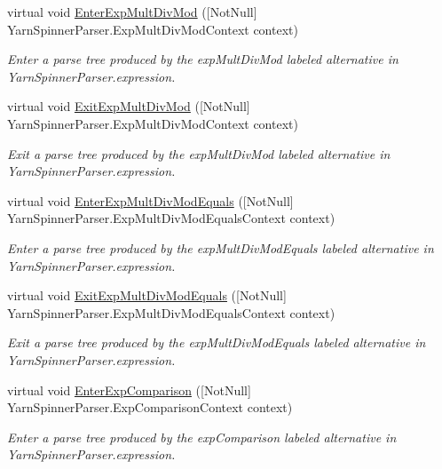 \begin{DoxyCompactItemize}
virtual void \hyperlink{a00196_a680b607d4481e92d0b601f2802d93584}{Enter\-Exp\-Mult\-Div\-Mod} (\mbox{[}Not\-Null\mbox{]} Yarn\-Spinner\-Parser.\-Exp\-Mult\-Div\-Mod\-Context context)
\begin{DoxyCompactList}\small\item\em Enter a parse tree produced by the {\ttfamily exp\-Mult\-Div\-Mod} labeled alternative in Yarn\-Spinner\-Parser.\-expression. \end{DoxyCompactList}\item 
virtual void \hyperlink{a00196_ac874c7fdb818e8f1d4a0ed8cb272804c}{Exit\-Exp\-Mult\-Div\-Mod} (\mbox{[}Not\-Null\mbox{]} Yarn\-Spinner\-Parser.\-Exp\-Mult\-Div\-Mod\-Context context)
\begin{DoxyCompactList}\small\item\em Exit a parse tree produced by the {\ttfamily exp\-Mult\-Div\-Mod} labeled alternative in Yarn\-Spinner\-Parser.\-expression. \end{DoxyCompactList}\item 
virtual void \hyperlink{a00196_aa9040fe56a7c7b7452c4284a1e13752a}{Enter\-Exp\-Mult\-Div\-Mod\-Equals} (\mbox{[}Not\-Null\mbox{]} Yarn\-Spinner\-Parser.\-Exp\-Mult\-Div\-Mod\-Equals\-Context context)
\begin{DoxyCompactList}\small\item\em Enter a parse tree produced by the {\ttfamily exp\-Mult\-Div\-Mod\-Equals} labeled alternative in Yarn\-Spinner\-Parser.\-expression. \end{DoxyCompactList}\item 
virtual void \hyperlink{a00196_aac772034f0fc8877ea587dc47e875997}{Exit\-Exp\-Mult\-Div\-Mod\-Equals} (\mbox{[}Not\-Null\mbox{]} Yarn\-Spinner\-Parser.\-Exp\-Mult\-Div\-Mod\-Equals\-Context context)
\begin{DoxyCompactList}\small\item\em Exit a parse tree produced by the {\ttfamily exp\-Mult\-Div\-Mod\-Equals} labeled alternative in Yarn\-Spinner\-Parser.\-expression. \end{DoxyCompactList}\item 
virtual void \hyperlink{a00196_a246642cc69e5c444342c9856893294db}{Enter\-Exp\-Comparison} (\mbox{[}Not\-Null\mbox{]} Yarn\-Spinner\-Parser.\-Exp\-Comparison\-Context context)
\begin{DoxyCompactList}\small\item\em Enter a parse tree produced by the {\ttfamily exp\-Comparison} labeled alternative in Yarn\-Spinner\-Parser.\-expression. \end{DoxyCompactList}\item 

\end{DoxyCompactItemize}
